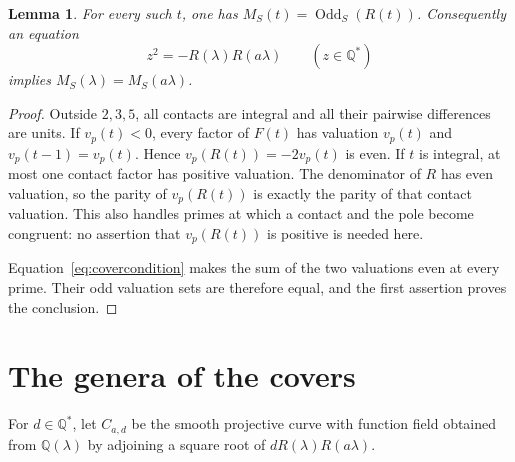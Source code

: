 \documentclass[11pt,a4paper]{article}
\newtheorem{lemma}[theorem]{Lemma}
\newcommand{\Q}{\mathbb Q}\newcommand{\Z}{\mathbb Z}
\DeclareMathOperator{\Odd}{Odd}
\begin{document}
\begin{lemma}\label{lem:odd}
For every such $t$, one has $M_S(t)=\Odd_S(R(t))$.
Consequently an equation
\begin{equation}\label{eq:covercondition}
                       z^2=-R(\lambda)R(a\lambda)
                       \qquad(z\in\Q^*)
\end{equation}
implies $M_S(\lambda)=M_S(a\lambda)$.
\end{lemma}
\begin{proof}
Outside $2,3,5$, all contacts are integral and all their pairwise
differences are units. If $v_p(t)<0$, every factor of $F(t)$
has valuation $v_p(t)$ and $v_p(t-1)=v_p(t)$. Hence
$v_p(R(t))=-2v_p(t)$ is even. If $t$ is integral, at most one
contact factor has positive valuation. The denominator of $R$
has even valuation, so the parity of $v_p(R(t))$ is exactly
the parity of that contact valuation. This also handles primes
at which a contact and the pole become congruent: no assertion
that $v_p(R(t))$ is positive is needed here.

Equation~\eqref{eq:covercondition} makes the sum of the two
valuations even at every prime. Their odd valuation sets are
therefore equal, and the first assertion proves the conclusion.
\end{proof}

\section{The genera of the covers}

For $d\in\Q^*$, let $C_{a,d}$ be the smooth projective curve
with function field obtained from $\Q(\lambda)$ by adjoining
a square root of $dR(\lambda)R(a\lambda)$.
\end{document}
